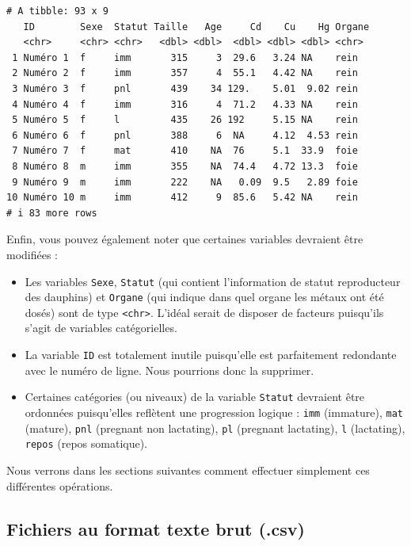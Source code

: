 \documentclass[
  a4paper,
  DIV=11,
  numbers=noendperiod,
  oneside]{scrreprt}
\providecommand{\tightlist}{%
  \setlength{\itemsep}{0pt}\setlength{\parskip}{0pt}}\usepackage{longtable,booktabs,array}
\begin{document}
\begin{verbatim}
# A tibble: 93 x 9
   ID        Sexe  Statut Taille   Age     Cd    Cu    Hg Organe
   <chr>     <chr> <chr>   <dbl> <dbl>  <dbl> <dbl> <dbl> <chr> 
 1 Numéro 1  f     imm       315     3  29.6   3.24 NA    rein  
 2 Numéro 2  f     imm       357     4  55.1   4.42 NA    rein  
 3 Numéro 3  f     pnl       439    34 129.    5.01  9.02 rein  
 4 Numéro 4  f     imm       316     4  71.2   4.33 NA    rein  
 5 Numéro 5  f     l         435    26 192     5.15 NA    rein  
 6 Numéro 6  f     pnl       388     6  NA     4.12  4.53 rein  
 7 Numéro 7  f     mat       410    NA  76     5.1  33.9  foie  
 8 Numéro 8  m     imm       355    NA  74.4   4.72 13.3  foie  
 9 Numéro 9  m     imm       222    NA   0.09  9.5   2.89 foie  
10 Numéro 10 m     imm       412     9  85.6   5.42 NA    rein  
# i 83 more rows
\end{verbatim}

Enfin, vous pouvez également noter que certaines variables devraient
être modifiées :

\begin{itemize}
\tightlist
\item
  Les variables \texttt{Sexe}, \texttt{Statut} (qui contient
  l'information de statut reproducteur des dauphins) et \texttt{Organe}
  (qui indique dans quel organe les métaux ont été dosés) sont de type
  \texttt{\textless{}chr\textgreater{}}. L'idéal serait de disposer de
  facteurs puisqu'ils s'agit de variables catégorielles.
\item
  La variable \texttt{ID} est totalement inutile puisqu'elle est
  parfaitement redondante avec le numéro de ligne. Nous pourrions donc
  la supprimer.
\item
  Certaines catégories (ou niveaux) de la variable \texttt{Statut}
  devraient être ordonnées puisqu'elles reflètent une progression
  logique : \texttt{imm} (immature), \texttt{mat} (mature), \texttt{pnl}
  (pregnant non lactating), \texttt{pl} (pregnant lactating), \texttt{l}
  (lactating), \texttt{repos} (repos somatique).
\end{itemize}

Nous verrons dans les sections suivantes comment effectuer simplement
ces différentes opérations.

\subsection{Fichiers au format texte brut (.csv)}\label{plaintext}
\end{document}

